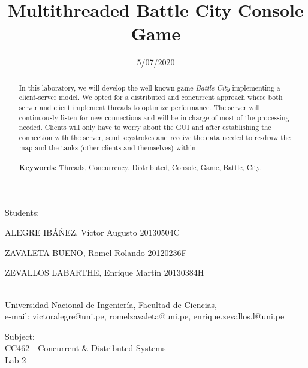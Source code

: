 \documentclass[10pt,a4paper]{article}
\theoremstyle{definition}
\begin{document}
	
\title{Multithreaded Battle City Console Game}
\date{5/07/2020}
\maketitle

\begin{center}
	Students:\\
	\vspace{5pt}
	{\large ALEGRE IB\'A\'NEZ, V\'ictor Augusto 20130504C

ZAVALETA BUENO, Romel Rolando 20120236F

ZEVALLOS LABARTHE, Enrique Mart\'in 20130384H}\\
	Universidad Nacional de Ingenier\'ia, Facultad de Ciencias,\\
	e-mail: victoralegre@uni.pe, romelzavaleta@uni.pe, enrique.zevallos.l@uni.pe
	
\end{center}
\vspace{5pt}
\begin{center}
	Subject:\\
	\vspace{5pt}
	{\large CC462 - Concurrent \& Distributed Systems
}\\
	{\large Lab 2}\\
	

	
\end{center}
\vspace{20pt}
\begin{abstract}
{\small
\hspace*{0.5cm}
	In this laboratory, we will develop the well-known game \textit{Battle City} implementing a client-server model. We opted for a distributed and concurrent approach where both server and client implement threads to optimize performance. The server will continuously listen for new connections and will be in charge of most of the processing needed. Clients will only have to worry about the GUI and after establishing the connection with the server, send keystrokes and receive the data needed to re-draw the map and the tanks (other clients and themselves) within.\\\\
\textbf{Keywords:} Threads, Concurrency, Distributed, Console, Game, Battle, City.
}
\end{abstract}




\tableofcontents
\end{document}
